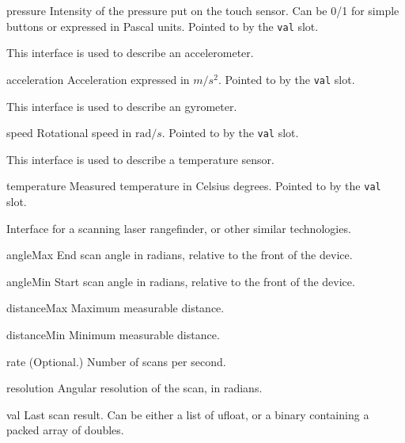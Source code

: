 \begin{urbiscriptapi}
\item[pressure] Intensity of the pressure put on the touch sensor. Can be
  0/1 for simple buttons or expressed in Pascal units. Pointed to by the
  \lstinline{val} slot.
\end{urbiscriptapi}



This interface is used to describe an accelerometer.

\begin{urbiscriptapi}
\item[acceleration] Acceleration expressed in $m/s^2$.  Pointed to by the
  \lstinline{val} slot.
\end{urbiscriptapi}

This interface is used to describe an gyrometer.

\begin{urbiscriptapi}
\item[speed] Rotational speed in $\mathrm{rad}/s$.  Pointed to by the
  \lstinline{val} slot.
\end{urbiscriptapi}

This interface is used to describe a temperature sensor.

\begin{urbiscriptapi}
\item[temperature] Measured temperature in Celsius degrees.  Pointed to by
  the \lstinline{val} slot.
\end{urbiscriptapi}

Interface for a scanning laser rangefinder, or other similar technologies.

\begin{urbiscriptapi}
\item[angleMax] End scan angle in radians, relative to the front of the
  device.


\item[angleMin] Start scan angle in radians, relative to the front of the
  device.


\item[distanceMax] Maximum measurable distance.


\item[distanceMin] Minimum measurable distance.


\item[rate]{} (Optional.) Number of scans per second.


\item[resolution] Angular resolution of the scan, in radians.


\item[val] Last scan result. Can be either a list of ufloat, or a binary
  containing a packed array of doubles.
\end{urbiscriptapi}


